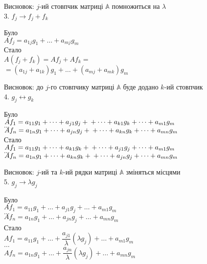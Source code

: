 \documentclass[a4paper, 10pt]{article}
\theoremstyle{theoremdd}
\theoremstyle{theoremdd}
\theoremstyle{theoremdd}
\theoremstyle{theoremdd}
\theoremstyle{theoremdd}
\theoremstyle{theoremdd}
\theoremstyle{theoremdd}
\theoremstyle{theoremdd}
\begin{document}
	Висновок: $j$-ий стовпчик матриці $\mathbb{A}$ помножиться на $\lambda$
	\bigskip \\
	3. $f_j \rightarrow f_j+f_k$
\multicolsep=0pt
	\begin{multicols}{2}
	Було \\
$Af_j = a_{1j}g_1 + \dots + a_{mj}g_m$
	\columnbreak
	\\
	Стало \\
$A(f_j+f_k) = Af_j + Af_k =$\\
$= (a_{1j}+a_{1k})g_1 + \dots + (a_{mj}+a_{mk})g_m$
	\end{multicols}
	Висновок: до $j$-го стовпчику матриці $\mathbb{A}$ буде додано $k$-ий стовпчик
	\bigskip \\
	
	4. $g_j \leftrightarrow g_k$
	\multicolsep=0pt
	\begin{multicols}{2}
	Було \\
	$Af_1 = a_{11}g_1 + \dots + a_{j1}g_j + \\
	+ \dots + a_{k1}g_k + \dots + a_{m1}g_m$ \\
	$\dots$\\
	$Af_n = a_{1n}g_1 + \dots + a_{jn}g_j + \\
	+ \dots + a_{kn}g_k + \dots + a_{mn}g_m$
	\columnbreak
	\\
	Стало \\
	$Af_1 = a_{11}g_1 + \dots + a_{k1}g_k + \\
	+ \dots + a_{j1}g_j + \dots + a_{m1}g_m$ \\
	$\dots$\\
	$Af_n = a_{1n}g_1 + \dots + a_{kn}g_k + \\
	+ \dots + a_{jn}g_j + \dots + a_{mn}g_m$
	\end{multicols}
	Висновок: $j$-ий та $k$-ий рядки матриці $\mathbb{A}$ зміняться місцями
	\bigskip \\
	5. $g_j \rightarrow \lambda g_j$
	\multicolsep=0pt
	\begin{multicols}{2}
	Було \\
	$Af_1 = a_{11}g_1 + \dots + a_{j1}g_j + \dots + a_{m1}g_m$\\
	$\dots$\\
	$Af_n = a_{1n}g_1 + \dots + a_{jn}g_j + \dots + a_{mn}g_m$
	\columnbreak
	\\
	Стало \\
	$Af_1 = a_{11}g_1 + \dots + \dfrac{a_{j1}}{\lambda} (\lambda g_j) + \dots + a_{m1}g_m$\\
	$\dots$\\
	$Af_n = a_{1n}g_1 + \dots + \dfrac{a_{jn}}{\lambda} (\lambda g_j) + \dots + a_{mn}g_m$
	\end{multicols}
\end{document}
